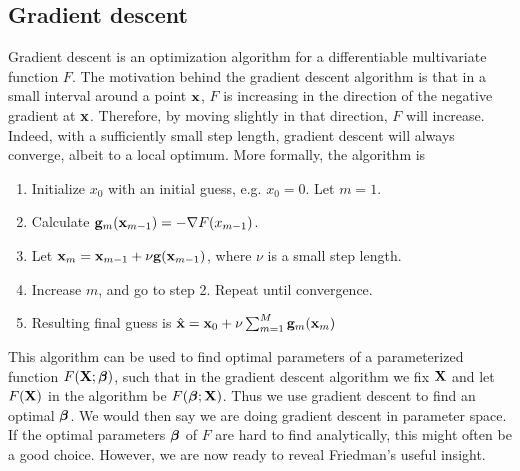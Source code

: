\subsection{Gradient descent}
Gradient descent is an optimization algorithm for a differentiable multivariate function $F$. The motivation behind the gradient descent algorithm is that in a small interval around a point $\mathbf{x}$, $F$ is increasing in the direction of the negative gradient at $\mathbf{x}$. Therefore, by moving slightly in that direction, $F$ will increase. Indeed, with a sufficiently small step length, gradient descent will always converge, albeit to a local optimum. More formally, the algorithm is
\begin{enumerate}
    \item Initialize $x_0$ with an initial guess, e.g. $x_0=0$. Let $m=1$.
    \item Calculate $\mathbf{g}_m(\mathbf{x}_{m-1})=-\nabla F({x_{m-1}})$.
    \item Let $\mathbf{x}_m=\mathbf{x}_{m-1}+\nu\mathbf{g}(\mathbf{x}_{m-1})$, where $\nu$ is a small step length.
    \item Increase $m$, and go to step 2. Repeat until convergence.
    \item Resulting final guess is $\hat{\mathbf{x}}=\mathbf{x}_0+\nu\sum_{m=1}^M\mathbf{g}_m(\mathbf{x}_m)$
\end{enumerate}
This algorithm can be used to find optimal parameters of a parameterized function $F(\mathbf{X};\boldsymbol{\beta})$, such that in the gradient descent algorithm we fix $\mathbf{X}$ and let $F(\mathbf{X})$ in the algorithm be $F(\boldsymbol{\beta};\mathbf{X})$. Thus we use gradient descent to find an optimal $\boldsymbol{\beta}$. We would then say we are doing gradient descent in parameter space. If the optimal parameters $\boldsymbol{\beta}$ of $F$ are hard to find analytically, this might often be a good choice. However, we are now ready to reveal Friedman's useful insight.

